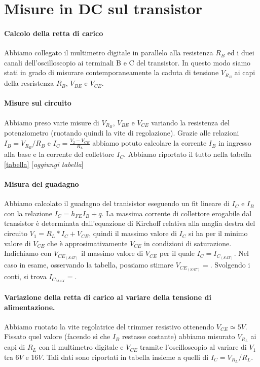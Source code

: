 \documentclass[10pt,a4paper]{article}
\newcommand{\rem}[1]{[\emph{#1}]}
\begin{document}
\section{Misure in DC sul transistor}
\paragraph{Calcolo della retta di carico}
Abbiamo collegato il multimetro digitale in parallelo alla resistenza $R_B$  ed i duei canali dell'oscilloscopio ai terminali B e C del transistor. In questo modo siamo stati in grado di misurare contemporaneamente la caduta di tensione $V_{R_B}$ ai capi della resristenza $R_B$, $V_{BE}$ e $V_{CE}$.
\paragraph{Misure sul circuito}
Abbiamo preso varie misure di $V_{R_B}$, $V_{BE}$ e $V_{CE}$  variando la resistenza del potenziometro (ruotando quindi la vite di regolazione). Grazie alle relazioni $I_B=V_{R_B}/R_B$ e $I_C=\frac{V_2-V_{CE}}{R_L}$ abbiamo potuto calcolare la corrente $I_B$ in ingresso alla base e la corrente del collettore $I_C$.
Abbiamo riportato il tutto nella tabella \ref{tabella}
\rem{aggiungi tabella}
\paragraph{Misura del guadagno}
Abbiamo calcolato il guadagno del tranisistor  eseguendo un fit lineare di $I_C$ e $I_B$ con la  relazione $I_C=h_{FE}I_B+q$.
La massima corrente di collettore erogabile dal transistor è determinata dall'equazione di Kirchoff relativa alla maglia destra del circuito  $V_1 = R_L*I_C + V_{CE}$, quindi il massimo valore di $I_C$ si ha per il minimo valore di $V_{CE}$ che è  approsimativamente $V_{CE}$ in condizioni di saturazione.
  Indichiamo con $V_ {CE_{(SAT)}}$  il massimo valore di $V_{CE}$ per il quale $I_C = I_{C_{(SAT)}}$. Nel caso in esame, osservando la tabella, possiamo  stimare $V_{CE_{(SAT)}}=$. Svolgendo i conti, si trova $I_{C_{MAX}} = $. 
\paragraph{Variazione della retta di carico al variare della tensione di alimentazione.}
 
Abbiamo ruotato la vite regolatrice del trimmer resistivo ottenendo $V_{CE}\simeq 5V$. Fissato quel valore  (facendo sì che $I_B$ restasse costante)  abbiamo misurato $V_{R_L}$ ai capi di $R_L$ con il multimetro digitale  e $V_{CE}$ tramite l'oscilloscopio al variare di $V_1$ tra $6 V$ e $16 V$. Tali dati sono riportati in tabella insieme a quelli di $I_C=V_{R_L}/R_L$.
\end{document}
